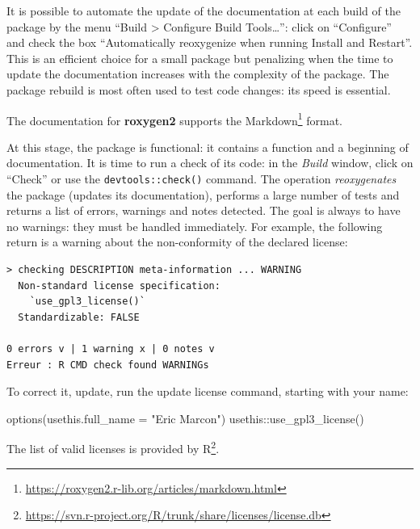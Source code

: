 \documentclass[
  12pt,
  american,
  a4paper,
  extrafontsizes,onecolumn,openright
  ]{memoir}
\newenvironment{Shaded}{\begin{snugshade}}{\end{snugshade}}
\newcommand{\AttributeTok}[1]{\textcolor[rgb]{0.77,0.63,0.00}{#1}}
\newcommand{\FunctionTok}[1]{\textcolor[rgb]{0.00,0.00,0.00}{#1}}
\newcommand{\NormalTok}[1]{#1}
\newcommand{\SpecialCharTok}[1]{\textcolor[rgb]{0.00,0.00,0.00}{#1}}
\newcommand{\StringTok}[1]{\textcolor[rgb]{0.31,0.60,0.02}{#1}}
\newlength{\rf}
\begin{document}
\normalsize

It is possible to automate the update of the documentation at each build of the package by the menu \enquote{Build \textgreater{} Configure Build Tools\ldots{}}: click on \enquote{Configure} and check the box \enquote{Automatically reoxygenize when running Install and Restart}.
This is an efficient choice for a small package but penalizing when the time to update the documentation increases with the complexity of the package. The package rebuild is most often used to test code changes: its speed is essential.

The documentation for \textbf{roxygen2} supports the Markdown\footnote{\url{https://roxygen2.r-lib.org/articles/markdown.html}} format.

At this stage, the package is functional: it contains a function and a beginning of documentation.
It is time to run a check of its code: in the \emph{Build} window, click on \enquote{Check} or use the \texttt{devtools::check()} command.
The operation \emph{reoxygenates} the package (updates its documentation), performs a large number of tests and returns a list of errors, warnings and notes detected.
The goal is always to have no warnings: they must be handled immediately.
For example, the following return is a warning about the non-conformity of the declared license:

\begin{verbatim}
> checking DESCRIPTION meta-information ... WARNING
  Non-standard license specification:
    `use_gpl3_license()`
  Standardizable: FALSE

0 errors v | 1 warning x | 0 notes v
Erreur : R CMD check found WARNINGs
\end{verbatim}

To correct it, update, run the update license command, starting with your name:

\scriptsize

\begin{Shaded}
\begin{Highlighting}[]
\FunctionTok{options}\NormalTok{(}\AttributeTok{usethis.full\_name =} \StringTok{"Eric Marcon"}\NormalTok{)}
\NormalTok{usethis}\SpecialCharTok{::}\FunctionTok{use\_gpl3\_license}\NormalTok{()}
\end{Highlighting}
\end{Shaded}

\normalsize

The list of valid licenses is provided by R\footnote{\url{https://svn.r-project.org/R/trunk/share/licenses/license.db}}.
\end{document}
